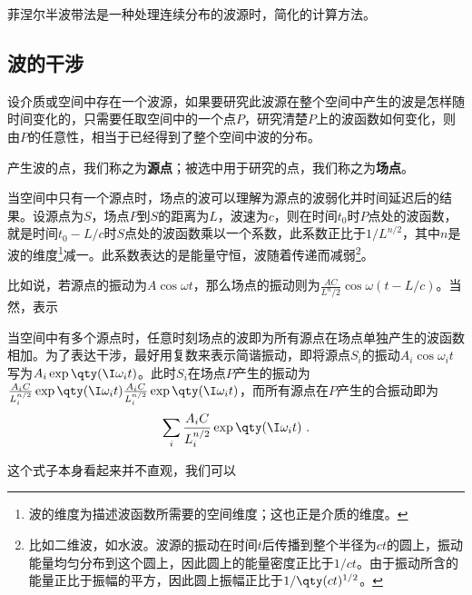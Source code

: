 



菲涅尔半波带法是一种处理连续分布的波源时，简化的计算方法。



\subsection{波的干涉}


设介质或空间中存在一个波源，如果要研究此波源在整个空间中产生的波是怎样随时间变化的，只需要任取空间中的一个点$P$，研究清楚$P$上的波函数如何变化，则由$P$的任意性，相当于已经得到了整个空间中波的分布。

产生波的点，我们称之为\textbf{源点}；被选中用于研究的点，我们称之为\textbf{场点}。

当空间中只有一个源点时，场点的波可以理解为源点的波弱化并时间延迟后的结果。设源点为$S$，场点$P$到$S$的距离为$L$，波速为$c$，则在时间$t_0$时$P$点处的波函数，就是时间$t_0-L/c$时$S$点处的波函数乘以一个系数，此系数正比于$1/L^{n/2}$，其中$n$是波的维度\footnote{波的维度为描述波函数所需要的空间维度；这也正是介质的维度。}减一。此系数表达的是能量守恒，波随着传递而减弱\footnote{比如二维波，如水波。波源的振动在时间$t$后传播到整个半径为$ct$的圆上，振动能量均匀分布到这个圆上，因此圆上的能量密度正比于$1/ct$。由于振动所含的能量正比于振幅的平方，因此圆上振幅正比于$1/\qty(ct)^{1/2}$。}。

比如说，若源点的振动为$A\cos \omega t$，那么场点的振动则为$\frac{AC}{L^n/2}\cos \omega(t-L/c)$。当然，表示

当空间中有多个源点时，任意时刻场点的波即为所有源点在场点单独产生的波函数相加。为了表达干涉，最好用复数来表示简谐振动，即将源点$S_i$的振动$A_i\cos\omega_it$写为$A_i\exp\qty(\I\omega_it)$。此时$S_i$在场点$P$产生的振动为$\frac{A_iC}{L_i^{n/2}}\exp\qty(\I\omega_it)\frac{A_iC}{L_i^{n/2}}\exp\qty(\I\omega_it)$，而所有源点在$P$产生的合振动即为
\begin{equation}
\sum_i \frac{A_iC}{L_i^{n/2}}\exp\qty(\I\omega_it)~. 
\end{equation}

这个式子本身看起来并不直观，我们可以






















